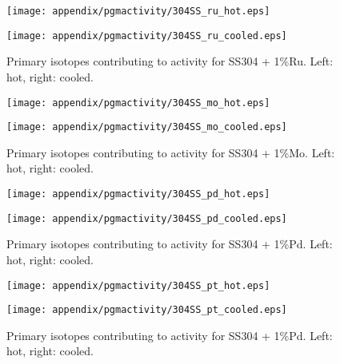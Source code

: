 \begin{figure}
\centering
\begin{minipage}{.49\textwidth}
\texttt{[image: appendix/pgmactivity/304SS\_ru\_hot.eps]}
\end{minipage}
\begin{minipage}{.49\textwidth}
\texttt{[image: appendix/pgmactivity/304SS\_ru\_cooled.eps]}
\end{minipage}
\caption{Primary isotopes contributing to activity for SS304 + 1\%Ru. Left: hot, right: cooled.}
\label{fig:activity304SSru}
\end{figure}

\begin{figure}
\centering
\begin{minipage}{.49\textwidth}
\texttt{[image: appendix/pgmactivity/304SS\_mo\_hot.eps]}
\end{minipage}
\begin{minipage}{.49\textwidth}
\texttt{[image: appendix/pgmactivity/304SS\_mo\_cooled.eps]}
\end{minipage}
\caption{Primary isotopes contributing to activity for SS304 + 1\%Mo. Left: hot, right: cooled.}
\label{fig:activity304SSmo}
\end{figure}

\begin{figure}
\centering
\begin{minipage}{.49\textwidth}
\texttt{[image: appendix/pgmactivity/304SS\_pd\_hot.eps]}
\end{minipage}
\begin{minipage}{.49\textwidth}
\texttt{[image: appendix/pgmactivity/304SS\_pd\_cooled.eps]}
\end{minipage}
\caption{Primary isotopes contributing to activity for SS304 + 1\%Pd. Left: hot, right: cooled.}
\label{fig:activity304SSpd}
\end{figure}

\begin{figure}
\centering
\begin{minipage}{.49\textwidth}
\texttt{[image: appendix/pgmactivity/304SS\_pt\_hot.eps]}
\end{minipage}
\begin{minipage}{.49\textwidth}
\texttt{[image: appendix/pgmactivity/304SS\_pt\_cooled.eps]}
\end{minipage}
\caption{Primary isotopes contributing to activity for SS304 + 1\%Pd. Left: hot, right: cooled.}
\label{fig:activity304SSpt}
\end{figure}


